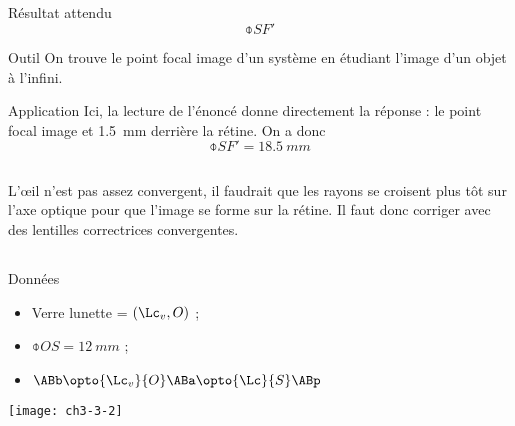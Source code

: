 \documentclass[../main/main.tex]{subfiles}
\begin{document}
\subsection{}
\begin{tcbraster}[raster columns=5, raster equal height=rows]
    \begin{NCprop}{Résultat attendu}
        \[\obar{SF'}\]
    \end{NCprop}
    \begin{NCdemo}[raster multicolumn=2]{Outil}
        On trouve le point focal image d'un système en étudiant l'image d'un
        objet à l'infini.
    \end{NCdemo}
    \begin{NCexem}[raster multicolumn=2]{Application}
        Ici, la lecture de l'énoncé donne directement la réponse : le point
        focal image et \SI{1.5}{mm} derrière la rétine. On a donc \[\obar{SF'} =
        \SI{18.5}{mm}\]
    \end{NCexem}
\end{tcbraster}
\subsection{}
L'œil n'est pas assez convergent, il faudrait que les rayons se croisent plus
tôt sur l'axe optique pour que l'image se forme sur la rétine. Il faut donc
corriger avec des lentilles correctrices convergentes.

\subsection{}
\begin{center}
    \begin{NCdefi}[width=.9\linewidth, sidebyside]{Données}
        \begin{itemize}
            \item Verre lunette = $(\Lc_v, O)$ ;
            \item $\obar{OS} = \SI{12}{mm}$ ;
            \item $\ABb \opto{\Lc_v}{O} \ABa \opto{\Lc}{S} \ABp$
        \end{itemize}
        \tcblower
        \begin{center}
            \texttt{[image: ch3-3-2]}
        \end{center}
    \end{NCdefi}
\end{center}
\end{document}
